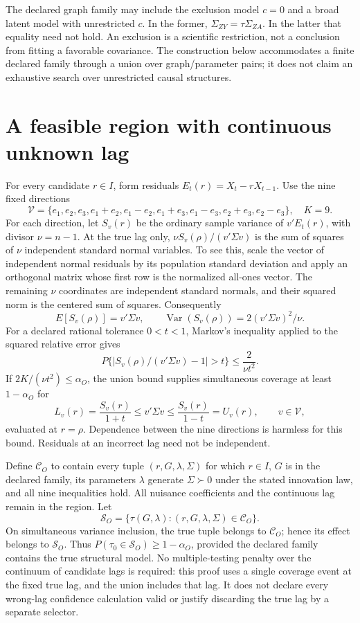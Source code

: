 The declared graph family may include the exclusion model \(c=0\) and a
broad latent model with unrestricted \(c\). In the former,
\(\Sigma_{ZY}=\tau\Sigma_{ZA}\). In the latter that equality need not
hold. An exclusion is a scientific restriction, not a conclusion from
fitting a favorable covariance. The construction below accommodates a
finite declared family through a union over graph/parameter pairs; it
does not claim an exhaustive search over unrestricted causal structures.

\hypertarget{a-feasible-region-with-continuous-unknown-lag}{%
\section{A feasible region with continuous unknown
lag}\label{a-feasible-region-with-continuous-unknown-lag}}

For every candidate \(r\in I\), form residuals \(E_t(r)=X_t-rX_{t-1}\).
Use the nine fixed directions \[
 \mathcal V=\{e_1,e_2,e_3,e_1+e_2,e_1-e_2,
 e_1+e_3,e_1-e_3,e_2+e_3,e_2-e_3\},\quad K=9.
\] For each direction, let \(S_v(r)\) be the ordinary sample variance of
\(v'E_t(r)\), with divisor \(\nu=n-1\). At the true lag only,
\(\nu S_v(\rho)/(v'\Sigma v)\) is the sum of squares of \(\nu\)
independent standard normal variables. To see this, scale the vector of
independent normal residuals by its population standard deviation and
apply an orthogonal matrix whose first row is the normalized all-ones
vector. The remaining \(\nu\) coordinates are independent standard
normals, and their squared norm is the centered sum of squares.
Consequently \[
 E[S_v(\rho)]=v'\Sigma v,\qquad
 \operatorname{Var}(S_v(\rho))=2(v'\Sigma v)^2/\nu.
\] For a declared rational tolerance \(0<t<1\), Markov's inequality
applied to the squared relative error gives \[
 P\{|S_v(\rho)/(v'\Sigma v)-1|>t\}\le\frac{2}{\nu t^2}.
\] If \(2K/(\nu t^2)\le\alpha_O\), the union bound supplies simultaneous
coverage at least \(1-\alpha_O\) for \[
 L_v(r)=\frac{S_v(r)}{1+t}\le v'\Sigma v
 \le \frac{S_v(r)}{1-t}=U_v(r),\qquad v\in\mathcal V,
\] evaluated at \(r=\rho\). Dependence between the nine directions is
harmless for this bound. Residuals at an incorrect lag need not be
independent.

Define \(\mathcal C_O\) to contain every tuple \((r,G,\lambda,\Sigma)\)
for which \(r\in I\), \(G\) is in the declared family, its parameters
\(\lambda\) generate \(\Sigma\succ0\) under the stated innovation law,
and all nine inequalities hold. All nuisance coefficients and the
continuous lag remain in the region. Let \[
 \mathcal S_O=\{\tau(G,\lambda):(r,G,\lambda,\Sigma)\in\mathcal C_O\}.
\] On simultaneous variance inclusion, the true tuple belongs to
\(\mathcal C_O\); hence its effect belongs to \(\mathcal S_O\). Thus
\(P(\tau_0\in\mathcal S_O)\ge1-\alpha_O\), provided the declared family
contains the true structural model. No multiple-testing penalty over the
continuum of candidate lags is required: this proof uses a single
coverage event at the fixed true lag, and the union includes that lag.
It does not declare every wrong-lag confidence calculation valid or
justify discarding the true lag by a separate selector.

